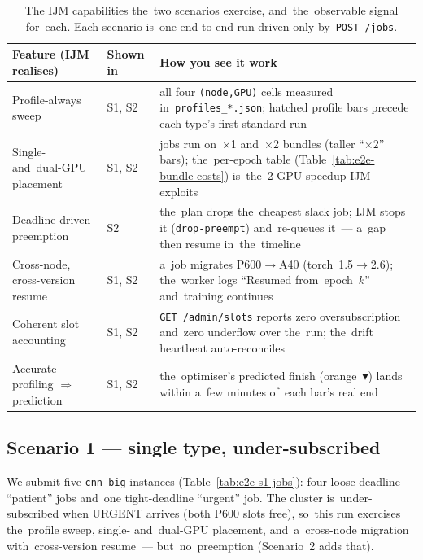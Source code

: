 \begin{table}[H]\centering\small
\begin{tabularx}{\textwidth}{@{}l l X@{}}\toprule
Feature (IJM realises) & Shown in & How you see it work \\\midrule
Profile-always sweep & S1, S2 & all four \texttt{(node,GPU)} cells measured in~\texttt{profiles\_*.json}; hatched profile bars precede each type's first standard run \\
Single- and~dual-GPU placement & S1, S2 & jobs run on~$\times$1 and~$\times$2 bundles (taller ``$\times2$'' bars); the~per-epoch table (Table~\ref{tab:e2e-bundle-costs}) is~the~2-GPU speedup IJM exploits \\
Deadline-driven preemption & S2 & the~plan drops the~cheapest slack job; IJM stops it (\texttt{drop-preempt}) and~re-queues it~--- a~gap then resume in~the~timeline \\
Cross-node, cross-version resume & S1, S2 & a~job migrates P600$\rightarrow$A40 (torch~1.5$\rightarrow$2.6); the~worker logs ``Resumed from~epoch~$k$'' and~training continues \\
Coherent slot accounting & S1, S2 & \texttt{GET /admin/slots} reports zero oversubscription and~zero underflow over the~run; the~drift heartbeat auto-reconciles \\
Accurate profiling $\Rightarrow$ prediction & S1, S2 & the~optimiser's predicted finish (orange~$\blacktriangledown$) lands within a~few minutes of~each bar's real end \\\bottomrule
\end{tabularx}
\caption{The IJM capabilities the~two scenarios exercise, and~the~observable
signal for~each.  Each scenario is~one end-to-end run driven only by~\texttt{POST
/jobs}.}\label{tab:e2e-features}
\end{table}

\subsection{Scenario 1 --- single type, under-subscribed}
\label{sec:e2e-s1}

We submit five \texttt{cnn\_big} instances (Table~\ref{tab:e2e-s1-jobs}): four
loose-deadline ``patient'' jobs and~one tight-deadline ``urgent'' job.  The
cluster is~under-subscribed when URGENT arrives (both P600 slots free), so~this
run exercises the~profile sweep, single- and~dual-GPU placement, and~a~cross-node
migration with~cross-version resume~--- but~no~preemption (Scenario~2 adds that).

